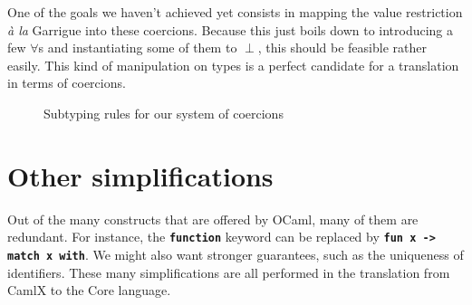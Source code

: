 \documentclass[10pt,a4paper,twoside,titlepage,twocolumn]{article}
\newcommand{\code}[1]{\textbf{\texttt{#1}}}
\begin{document}
One of the goals we haven't achieved yet consists in mapping the value
restriction \emph{à la} Garrigue into these coercions. Because this just boils
down to introducing a few $\forall$s and instantiating some of them to $\perp$,
this should be feasible rather easily. This kind of manipulation on types is
a perfect candidate for a translation in terms of coercions.

\begin{figure*}[t!]
  \TTtoprule
  \TTbottomrule
  \caption{\label{fig:subtyping_rules}Subtyping rules for our system of coercions}
\end{figure*}

\section{Other simplifications\label{desugar}}

Out of the many constructs that are offered by OCaml, many of them are
redundant. For instance, the \code{function} keyword can be replaced by
\code{fun x -> match x with}. We might also want stronger guarantees, such as
the uniqueness of identifiers. These many simplifications are all performed in the
translation from CamlX to the Core language.
\end{document}
